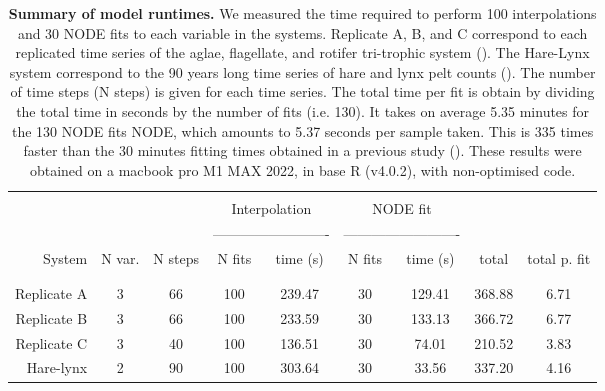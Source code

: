 \documentclass[11pt, oneside]{article}
\begin{document}
\newpage
\begin{table}[H]
\begin{center}
\caption{
\textbf{Summary of model runtimes.}
We measured the time required to perform 100 interpolations and 30 NODE fits to each variable in the systems.
Replicate A, B, and C correspond to each replicated time series of the aglae, flagellate, and rotifer tri-trophic system (\cite{Hiltunen2013}).
The Hare-Lynx system correspond to the 90 years long time series of hare and lynx pelt counts (\cite{Odum1972}).
The number of time steps (N steps) is given for each time series. 
The total time per fit is obtain by dividing the total time in seconds by the number of fits (i.e. 130).
It takes on average 5.35 minutes for the 130 NODE fits NODE, which amounts to 5.37 seconds per sample taken. 
This is 335 times faster than the 30 minutes fitting times obtained in a previous study (\cite{Bonnaffe2021a}).
These results were obtained on a macbook pro M1 MAX 2022, in base R (v4.0.2), with non-optimised code.
}
\begin{tabular}{rcccccccc}
\hline
& \\
& & & \multicolumn{2}{c}{Interpolation} & \multicolumn{2}{c}{NODE fit} & &  \\
& & & \multicolumn{2}{c}{-------------------------} & \multicolumn{2}{c}{-------------------------} & &  \\
System & N var. & N steps & N fits & time (s) & N fits & time (s) & total & total p. fit \\
& \\
\hline
& \\
Replicate A & 3 & 66 &  100 & 239.47 & 30 & 129.41 & 368.88 & 6.71 \\
Replicate B & 3 & 66 &  100 & 233.59 & 30 & 133.13 & 366.72 & 6.77 \\
Replicate C & 3 & 40 &  100 & 136.51 & 30 &  74.01 & 210.52 & 3.83 \\
Hare-lynx   & 2 & 90 &  100 & 303.64 & 30 &  33.56 & 337.20 & 4.16 \\
\end{tabular}
\end{center}
\end{table}
\newpage
\end{document}
